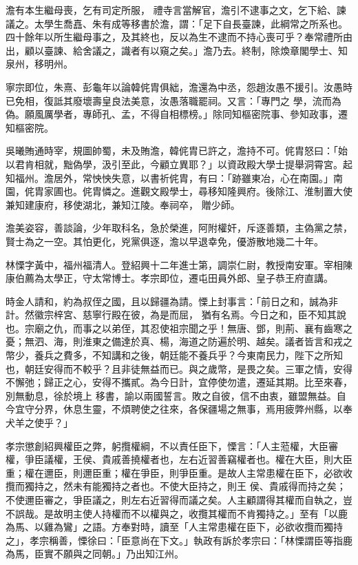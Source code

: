 \begin{pinyinscope}
 澹有本生繼母喪，乞有司定所服，
 禮寺言當解官，澹引不逮事之文，乞下給、諫議之。太學生喬嚞、朱有成等移書於澹，謂：「足下自長臺諫，此綱常之所系也。四十餘年以所生繼母事之，及其終也，反以為生不逮而不持心喪可乎？奉常禮所由出，顧以臺諫、給舍議之，識者有以窺之矣。」澹乃去。終制，除煥章閣學士、知泉州，移明州。



 寧宗即位，朱熹、彭龜年以論韓侂胄俱絀，澹還為中丞，怨趙汝愚不援引。汝愚時已免相，復詆其廢壞壽皇良法美意，汝愚落職罷祠。又言：「專門之
 學，流而為偽。願風厲學者，專師孔、孟，不得自相標榜。」除同知樞密院事、參知政事，遷知樞密院。



 吳曦賄通時宰，規圖帥蜀，未及賄澹，韓侂胄已許之，澹持不可。侂胄怒曰：「始以君肯相就，黜偽學，汲引至此，今顧立異耶？」以資政殿大學士提舉洞霄宮。起知福州。澹居外，常怏怏失意，以書祈侂胄，有曰：「跡雖東冶，心在南園。」南園，侂胄家圃也。侂胄憐之。進觀文殿學士，尋移知隆興府。後除江、淮制置大使兼知建康府，移使湖北，兼知江陵。奉祠卒，
 贈少師。



 澹美姿容，善談論，少年取科名，急於榮進，阿附權奸，斥逐善類，主偽黨之禁，賢士為之一空。其怕更化，兇黨俱逐，澹以早退幸免，優游散地幾二十年。



 林慄字黃中，福州福清人。登紹興十二年進士第，調崇仁尉，教授南安軍。宰相陳康伯薦為太學正，守太常博士。孝宗即位，遷屯田員外郎、皇子恭王府直講。



 時金人請和，約為叔侄之國，且以歸疆為請。慄上封事言：「前日之和，誠為非計。然徽宗梓宮、慈寧行殿在彼，為是而屈，
 猶有名焉。今日之和，臣不知其說也。宗廟之仇，而事之以弟侄，其忍使祖宗聞之乎！無唐、鄧，則荊、襄有齒寒之憂；無泗、海，則淮東之備達於真、楊，海道之防遍於明、越矣。議者皆言和戎之幣少，養兵之費多，不知講和之後，朝廷能不養兵乎？今東南民力，陛下之所知也，朝廷安得而不較乎？且非徒無益而已。與之歲幣，是畏之矣。三軍之情，安得不懈弛；歸正之心，安得不攜貳。為今日計，宜停使勿遣，遷延其期。比至來春，別無動息，徐於境上
 移書，諭以兩國誓言。敗之自彼，信不由衷，雖盟無益。自今宜守分界，休息生靈，不煩聘使之往來，各保疆場之無事，焉用疲弊州縣，以奉犬羊之使乎？」



 孝宗懲創紹興權臣之弊，躬攬權綱，不以責任臣下，慄言：「人主蒞權，大臣審權，爭臣議權，王侯、貴戚善撓權者也，左右近習善竊權者也。權在大臣，則大臣重；權在邇臣，則邇臣重；權在爭臣，則爭臣重。是故人主常患權在臣下，必欲收攬而獨持之，然未有能獨持之者也。不使大臣持之，則王
 侯、貴戚得而持之矣；不使邇臣審之，爭臣議之，則左右近習得而議之矣。人主顧謂得其權而自執之，豈不誤哉。是故明主使人持權而不以權與之，收攬其權而不肯獨持之。」至有「以鹿為馬、以雞為鸞」之語。方奉對時，讀至「人主常患權在臣下，必欲收攬而獨持之」，孝宗稱善，慄徐曰：「臣意尚在下文。」執政有訴於孝宗曰：「林慄謂臣等指鹿為馬，臣實不願與之同朝。」乃出知江州。




\end{pinyinscope}
